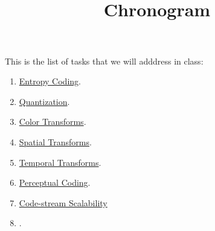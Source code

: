 

\title{\SM{} \\ Chronogram}

\maketitle

This is the list of tasks that we will adddress in class:

\begin{enumerate}
\item \href{https://sistemas-multimedia.github.io/contents/entropy_coding/#x1-110007}{Entropy Coding}.
\item \href{https://sistemas-multimedia.github.io/contents/quantization/#x1-150008}{Quantization}.
\item \href{https://sistemas-multimedia.github.io/contents/color_transforms/#x1-100006}{Color Transforms}.
\item \href{https://sistemas-multimedia.github.io/contents/spatial_transforms/#x1-80006}{Spatial Transforms}.
\item \href{https://sistemas-multimedia.github.io/contents/temporal_transforms/#x1-90008}{Temporal Transforms}.
\item \href{https://sistemas-multimedia.github.io/contents/perceptual_coding/#x1-100009}{Perceptual Coding}.
\item \href{https://sistemas-multimedia.github.io/contents/data_scalability/#x1-150008}{Code-stream Scalability}
\item .
\end{enumerate}
